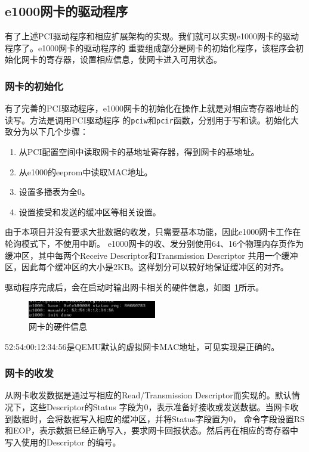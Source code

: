 \documentclass[a4paper,twoside]{ctexrep}
\begin{document}
\begin{spacing}{1.2}
\subsection{e1000网卡的驱动程序}

有了上述PCI驱动程序和相应扩展架构的实现。我们就可以实现e1000网卡的驱动程序了。e1000网卡的驱动程序的
重要组成部分是网卡的初始化程序，该程序会初始化网卡的寄存器，设置相应信息，使网卡进入可用状态。

\subsubsection{网卡的初始化}

有了完善的PCI驱动程序，e1000网卡的初始化在操作上就是对相应寄存器地址的读写。方法是调用PCI驱动程序
的\texttt{pciw}和\texttt{pcir}函数，分别用于写和读。初始化大致分为以下几个步骤：

\begin{enumerate}
	\item 从PCI配置空间中读取网卡的基地址寄存器，得到网卡的基地址。
	\item 从e1000的eeprom中读取MAC地址。
	\item 设置多播表为全0。
	\item 设置接受和发送的缓冲区等相关设置。
\end{enumerate}

由于本项目并没有要求大批数据的收发，只需要基本功能，因此e1000网卡工作在轮询模式下，不使用中断。
e1000网卡的收、发分别使用64、16个物理内存页作为缓冲区，其中每两个Receive Descriptor和Transmission Descriptor
共用一个缓冲区，因此每个缓冲区的大小是2KB。这样划分可以较好地保证缓冲区的对齐。

驱动程序完成后，会在启动时输出网卡相关的硬件信息，如图~\ref{fig:initnet}所示。
\begin{figure}[htb]
	\centering
	\caption{网卡的硬件信息}
	\label{fig:initnet}
	\includegraphics[width=0.5\textwidth]{inite1000.png}
\end{figure}
52:54:00:12:34:56是QEMU默认的虚拟网卡MAC地址，可见实现是正确的。

\subsubsection{网卡的收发}

从网卡收发数据是通过写相应的Read/Transmission Descriptor而实现的。默认情况下，这些Descriptor的Status
字段为0，表示准备好接收或发送数据。当网卡收到数据时，会将数据写入相应的缓冲区，并将Status字段置为0，
命令字段设置RS和EOP，表示数据已经正确写入，要求网卡回报状态。然后再在相应的寄存器中写入使用的Descriptor
的编号。


\end{spacing}
\end{document}
